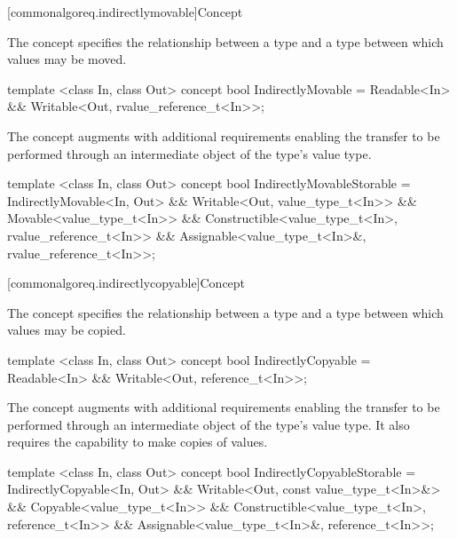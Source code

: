 [commonalgoreq.indirectlymovable]{Concept }

\pnum
The  concept specifies the relationship between a 
type and a  type between which values may be moved.

%
\begin{codeblock}
  template <class In, class Out>
  concept bool IndirectlyMovable =
    Readable<In> &&
    Writable<Out, rvalue_reference_t<In>>;
\end{codeblock}

\pnum
The  concept augments  with additional
requirements enabling the transfer to be performed through an intermediate object of the
 type's value type.

%
\begin{codeblock}
  template <class In, class Out>
  concept bool IndirectlyMovableStorable =
    IndirectlyMovable<In, Out> &&
    Writable<Out, value_type_t<In>> &&
    Movable<value_type_t<In>> &&
    Constructible<value_type_t<In>, rvalue_reference_t<In>> &&
    Assignable<value_type_t<In>&, rvalue_reference_t<In>>;
\end{codeblock}

[commonalgoreq.indirectlycopyable]{Concept }

\pnum
The  concept specifies the relationship between a 
type and a  type between which values may be copied.

%
\begin{codeblock}
  template <class In, class Out>
  concept bool IndirectlyCopyable =
    Readable<In> &&
    Writable<Out, reference_t<In>>;
\end{codeblock}

\pnum
The  concept augments  with additional
requirements enabling the transfer to be performed through an intermediate object of the
 type's value type. It also requires the capability to make copies of values.

%
\begin{codeblock}
  template <class In, class Out>
  concept bool IndirectlyCopyableStorable =
    IndirectlyCopyable<In, Out> &&
    Writable<Out, const value_type_t<In>&> &&
    Copyable<value_type_t<In>> &&
    Constructible<value_type_t<In>, reference_t<In>> &&
    Assignable<value_type_t<In>&, reference_t<In>>;
\end{codeblock}

